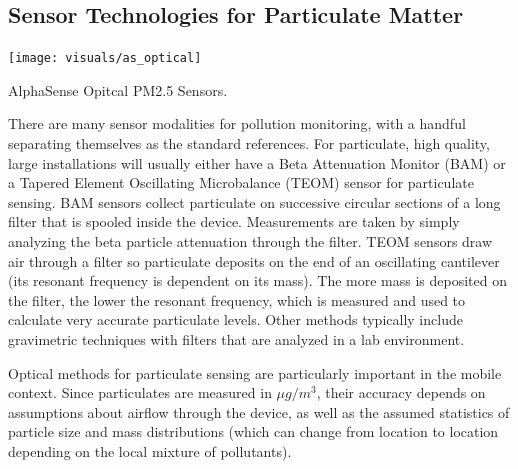 \subsection{Sensor Technologies for Particulate Matter}

\begin{marginfigure}[3.5cm]
 	\texttt{[image: visuals/as\_optical]}               
 	 \caption{AlphaSense Opitcal PM2.5 Sensors.}
  	\label{fig:as_optical}
\end{marginfigure}

There are many sensor modalities for pollution monitoring, with a handful separating themselves as the standard references.  For particulate, high quality, large installations will usually either have a Beta Attenuation Monitor (BAM) or a Tapered Element Oscillating Microbalance (TEOM) sensor for particulate sensing.  BAM sensors collect particulate on successive circular sections of a long filter that is spooled inside the device.  Measurements are taken by simply analyzing the beta particle attenuation through the filter.  TEOM sensors draw air through a filter so particulate deposits on the end of an oscillating cantilever (its resonant frequency is dependent on its mass).  The more mass is deposited on the filter, the lower the resonant frequency, which is measured and used to calculate very accurate particulate levels.  Other methods typically include gravimetric techniques with filters that are analyzed in a lab environment.

Optical methods for particulate sensing are particularly important in the mobile context.  Since particulates are measured in \(\mu g/m^3\), their accuracy depends on assumptions about airflow through the device, as well as the assumed statistics of particle size and mass distributions (which can change from location to location depending on the local mixture of pollutants).  

